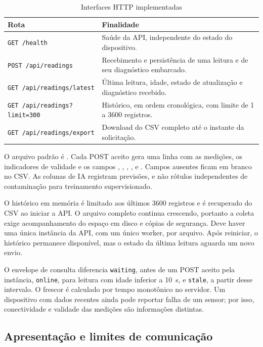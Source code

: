 \begin{table}[htbp]
\centering
\caption{Interfaces HTTP implementadas}
\label{tab:api}
\small
\begin{tabularx}{\textwidth}{L{5.0cm}Y}
\toprule
Rota & Finalidade\\
\midrule
\texttt{GET /health} & Saúde da API, independente do estado do dispositivo.\\
\texttt{POST /api/readings} & Recebimento e persistência de uma leitura e de seu diagnóstico embarcado.\\
\texttt{GET /api/readings/latest} & Última leitura, idade, estado de atualização e diagnóstico recebido.\\
\texttt{GET /api/readings?limit=300} & Histórico, em ordem cronológica, com limite de 1 a 3600 registros.\\
\texttt{GET /api/readings/export} & Download do CSV completo até o instante da solicitação.\\
\bottomrule
\end{tabularx}
\end{table}

O arquivo padrão é . Cada POST aceito
gera uma linha com as medições, os indicadores de validade e os campos
, , ,
,  e
. Campos ausentes ficam em branco no CSV.
As colunas de IA registram previsões, e não rótulos independentes de
contaminação para treinamento supervisionado.

O histórico em memória é limitado aos últimos 3600 registros e é
recuperado do CSV ao iniciar a API. O arquivo completo continua crescendo,
portanto a coleta exige acompanhamento do espaço em disco e cópias de
segurança. Deve haver uma única instância da API, com um único worker,
por arquivo. Após reiniciar, o histórico permanece disponível, mas o
estado da última leitura aguarda um novo envio.

O envelope de consulta diferencia \texttt{waiting}, antes de um POST
aceito pela instância, \texttt{online}, para leitura com idade inferior
a 10~s, e \texttt{stale}, a partir desse intervalo. O frescor é calculado
por tempo monotônico no servidor. Um dispositivo com dados recentes
ainda pode reportar falha de um sensor; por isso, conectividade e
validade das medições são informações distintas.

\subsection{Apresentação e limites de comunicação}

